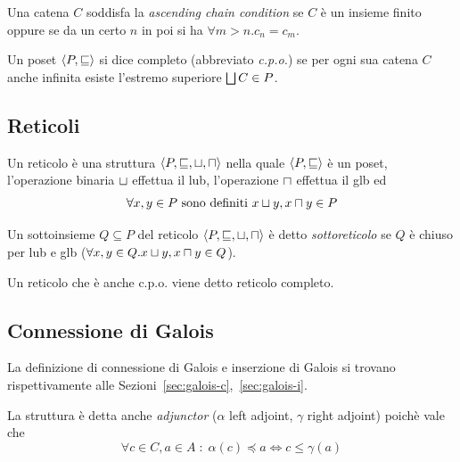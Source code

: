 \begin{definition}
Una catena $C$ soddisfa la \emph{ascending chain condition} se $C$ è un insieme finito oppure se da un certo $n$ in poi si ha $\forall m > n . c_n = c_m$.
\end{definition}

\begin{definition}
Un poset $\langle P, \sqsubseteq \rangle$ si dice completo (abbreviato \emph{c.p.o.}) se per ogni sua catena $C$ anche infinita esiste l'estremo superiore $\join[C] \in P$.
\end{definition}

\subsection{Reticoli}

\begin{definition}[Reticolo]
Un reticolo è una struttura $\struct{P, \sqsubseteq, \join, \meet}$ nella quale $\langle P, \sqsubseteq \rangle$ è un poset, l'operazione binaria $\join$ effettua il lub, l'operazione $\meet$ effettua il glb ed 
\[ \forall x,y \in P \text{ sono definiti } \join[x][y], \meet[x][y] \in P \]
\end{definition}

\begin{definition}[Sottoreticolo]
Un sottoinsieme $Q \subseteq P$ del reticolo $\struct{P, \sqsubseteq, \join, \meet}$ è detto \emph{sottoreticolo} se $Q$ è chiuso per lub e glb ($\forall x,y \in Q . \join[x][y], \meet[x][y] \in Q$). 
\end{definition}

\begin{definition}
Un reticolo che è anche c.p.o. viene detto reticolo completo.
\end{definition}

\subsection{Connessione di Galois}\label{sec:galois}

La definizione di connessione di Galois e inserzione di Galois si trovano rispettivamente alle Sezioni~\ref{sec:galois-c},~\ref{sec:galois-i}.

\begin{theorem}
La struttura è detta anche \emph{adjunctor} ($\alpha$ left adjoint, $\gamma$ right adjoint) poichè vale che
$$\forall c \in C, a \in A \; : \; \alpha(c) \preceq a \Leftrightarrow c \le \gamma(a)$$
\end{theorem}

